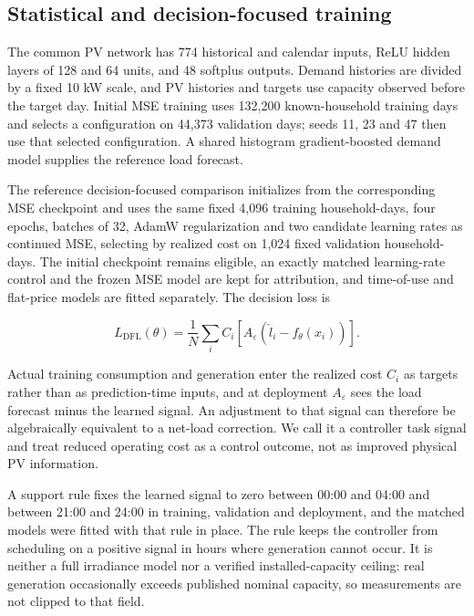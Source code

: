 \documentclass[pdflatex,Numbered,sn-basic]{sn-jnl}
\begin{document}
\subsection{Statistical and decision-focused training}

The common PV network has 774 historical and calendar inputs, ReLU hidden layers of 128 and 64 units, and 48 softplus outputs. Demand histories are divided by a fixed 10 kW scale, and PV histories and targets use capacity observed before the target day. Initial MSE training uses 132,200 known-household training days and selects a configuration on 44,373 validation days; seeds 11, 23 and 47 then use that selected configuration. A shared histogram gradient-boosted demand model supplies the reference load forecast.

The reference decision-focused comparison initializes from the corresponding MSE checkpoint and uses the same fixed 4,096 training household-days, four epochs, batches of 32, AdamW regularization and two candidate learning rates as continued MSE, selecting by realized cost on 1,024 fixed validation household-days. The initial checkpoint remains eligible, an exactly matched learning-rate control and the frozen MSE model are kept for attribution, and time-of-use and flat-price models are fitted separately. The decision loss is

\begin{equation}
L_{\mathrm{DFL}}(\theta) = \frac{1}{N} \sum_i C_i\!\left[ A_\varepsilon\!\left( \hat{l}_i - f_\theta(x_i) \right) \right].
\label{eq4}
\end{equation}

Actual training consumption and generation enter the realized cost $C_i$ as targets rather than as prediction-time inputs, and at deployment $A_\varepsilon$ sees the load forecast minus the learned signal. An adjustment to that signal can therefore be algebraically equivalent to a net-load correction. We call it a controller task signal and treat reduced operating cost as a control outcome, not as improved physical PV information.

A support rule fixes the learned signal to zero between 00:00 and 04:00 and between 21:00 and 24:00 in training, validation and deployment, and the matched models were fitted with that rule in place. The rule keeps the controller from scheduling on a positive signal in hours where generation cannot occur. It is neither a full irradiance model nor a verified installed-capacity ceiling: real generation occasionally exceeds published nominal capacity, so measurements are not clipped to that field.
\end{document}
